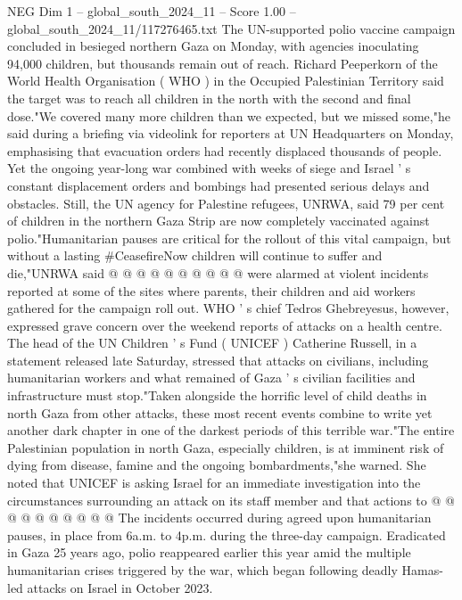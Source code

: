 \begin{textsample}{NEG Dim 1 – global\_south\_2024\_11 – Score 1.00 – global\_south\_2024\_11/117276465.txt}  \label{ex:f1_neg_284}
The UN-supported polio vaccine campaign concluded in besieged northern Gaza on Monday, with agencies inoculating 94,000 children, but thousands remain out of reach.
Richard Peeperkorn of the World Health Organisation ( WHO ) in the Occupied Palestinian Territory said the target was to reach all children in the north with the second and final dose."We covered many more children than we expected, but we missed some,"he said during a briefing via videolink for reporters at UN Headquarters on Monday, emphasising that evacuation orders had recently displaced thousands of people.
Yet the ongoing year-long war combined with weeks of siege and Israel ' s constant displacement orders and bombings had presented serious delays and obstacles.
Still, the UN agency for Palestine refugees, UNRWA, said 79 per cent of children in the northern Gaza Strip are now completely vaccinated against polio."Humanitarian pauses are critical for the rollout of this vital campaign, but without a lasting \#CeasefireNow children will continue to suffer and die,"UNRWA said @ @ @ @ @ @ @ @ @ @ were alarmed at violent incidents reported at some of the sites where parents, their children and aid workers gathered for the campaign roll out.
WHO ' s chief Tedros Ghebreyesus, however, expressed grave concern over the weekend reports of attacks on a health centre.
The head of the UN Children ' s Fund ( UNICEF ) Catherine Russell, in a statement released late Saturday, stressed that attacks on civilians, including humanitarian workers and what remained of Gaza ' s civilian facilities and infrastructure must stop."Taken alongside the horrific level of child deaths in north Gaza from other attacks, these most recent events combine to write yet another dark chapter in one of the darkest periods of this terrible war."The entire Palestinian population in north Gaza, especially children, is at imminent risk of dying from disease, famine and the ongoing bombardments,"she warned.
She noted that UNICEF is asking Israel for an immediate investigation into the circumstances surrounding an attack on its staff member and that actions to @ @ @ @ @ @ @ @ @ @ The incidents occurred during agreed upon humanitarian pauses, in place from 6a.m. to 4p.m. during the three-day campaign.
Eradicated in Gaza 25 years ago, polio reappeared earlier this year amid the multiple humanitarian crises triggered by the war, which began following deadly Hamas-led attacks on Israel in October 2023.

\end{textsample}
